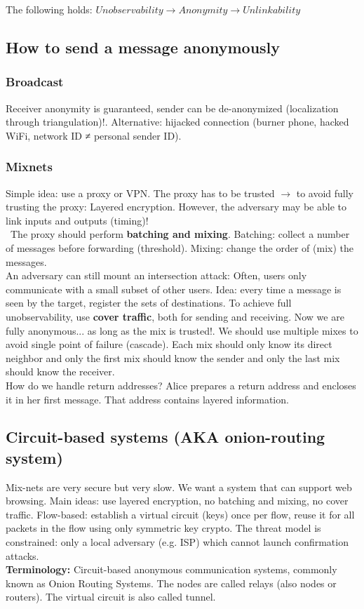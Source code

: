 \documentclass[11pt,oneside,a4paper]{article}
\begin{document}
The following holds: $Unobservability \rightarrow Anonymity \rightarrow Unlinkability$

\subsection{How to send a message anonymously}

\subsubsection{Broadcast}

Receiver anonymity is guaranteed, sender can be de-anonymized (localization through triangulation)!. Alternative: hijacked connection (burner phone, hacked WiFi, network ID ≠ personal sender ID).

\subsubsection{Mixnets}

Simple idea: use a proxy or VPN. The proxy has to be trusted $\rightarrow$ to avoid fully trusting the proxy: Layered encryption. However, the adversary may be able to link inputs
and outputs (timing)!\\\
The proxy should perform \textbf{batching and mixing}. Batching: collect a number of messages
before forwarding (threshold). Mixing: change the order of (mix) the messages.\\
An adversary can still mount an intersection attack: Often, users only communicate with a
small subset of other users. Idea: every time a message is seen by the target, register the sets of destinations. To achieve full unobservability, use \textbf{cover traffic}, both for sending and receiving. Now we are fully anonymous... as long as the mix is trusted!. We should use multiple mixes to avoid single point of failure (cascade). Each mix should only know its direct neighbor and only the first mix should know the sender and only the last mix should know the receiver.\\
How do we handle return addresses? Alice prepares a return address and encloses it in her first message. That address contains layered information.

\subsection{Circuit-based systems (AKA onion-routing system)}

Mix-nets are very secure but very slow. We want a system that can support web browsing. Main ideas: use layered encryption, no batching and mixing, no cover traffic. Flow-based: establish a virtual circuit (keys) once per flow, reuse it for all packets in the flow using only symmetric key crypto. The threat model is constrained: only a local adversary (e.g. ISP) which cannot launch confirmation attacks.\\
\textbf{Terminology:} Circuit-based anonymous communication systems, commonly known as Onion Routing Systems. The nodes are called relays (also nodes or routers). The virtual circuit is also called tunnel.
\end{document}
